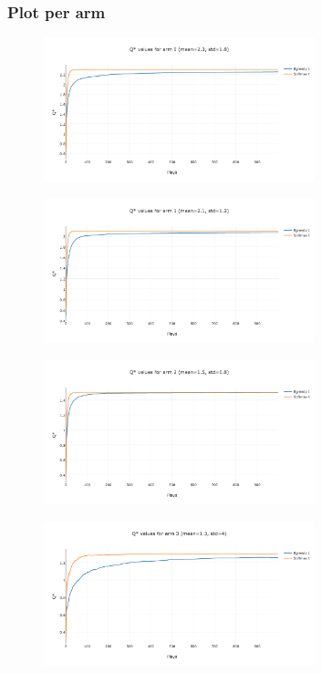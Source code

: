 \documentclass[11pt]{article}
\begin{document}
\subsubsection{Plot per arm}

\begin{figure}[H]
   \centering
   \includegraphics[width=0.7\textwidth]{img/1-3/q1.png}
\end{figure}

\begin{figure}[H]
   \centering
   \includegraphics[width=0.7\textwidth]{img/1-3/q2.png}
\end{figure}

\begin{figure}[H]
   \centering
   \includegraphics[width=0.7\textwidth]{img/1-3/q3.png}
\end{figure}


\begin{figure}[H]
   \centering
   \includegraphics[width=0.7\textwidth]{img/1-3/q4.png}
\end{figure}
\end{document}
